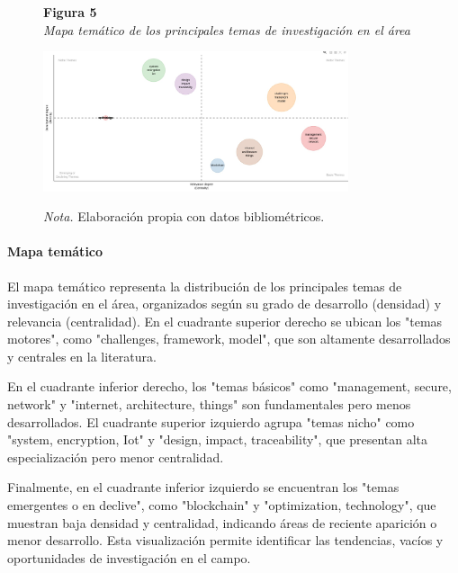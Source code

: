 \begin{figure}[htbp]
    \begin{flushleft}
        \textbf{Figura 5}\\[2em]
        \textit{Mapa temático de los principales temas de investigación en el área}
    \end{flushleft}
    \vspace{1em}
    \centering
    \includegraphics[width=0.8\textwidth]{Images/MapaTematico.jpeg}
    \vspace{2em}
    \begin{flushleft}
        \textit{Nota.} Elaboración propia con datos bibliométricos.
    \end{flushleft}
    \label{fig:mapa_tematico}
\end{figure}

\paragraph{Mapa temático}
El mapa temático representa la distribución de los principales temas de investigación en el área, organizados según su grado de desarrollo (densidad) y relevancia (centralidad). En el cuadrante superior derecho se ubican los "temas motores", como "challenges, framework, model", que son altamente desarrollados y centrales en la literatura.

En el cuadrante inferior derecho, los "temas básicos" como "management, secure, network" y "internet, architecture, things" son fundamentales pero menos desarrollados. El cuadrante superior izquierdo agrupa "temas nicho" como "system, encryption, Iot" y "design, impact, traceability", que presentan alta especialización pero menor centralidad.

Finalmente, en el cuadrante inferior izquierdo se encuentran los "temas emergentes o en declive", como "blockchain" y "optimization, technology", que muestran baja densidad y centralidad, indicando áreas de reciente aparición o menor desarrollo. Esta visualización permite identificar las tendencias, vacíos y oportunidades de investigación en el campo.

